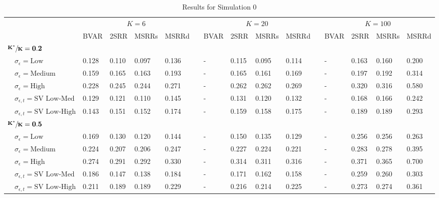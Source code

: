 \begin{table}[!tbp]
\caption{Results for Simulation 0\label{s1_table}} 
\begin{center}
\begin{tabular}{lllllcllllcllll}
\hline\hline
\multicolumn{1}{l}{\bfseries }&\multicolumn{4}{c}{\bfseries $K=6$}&\multicolumn{1}{c}{\bfseries }&\multicolumn{4}{c}{\bfseries $K=20$}&\multicolumn{1}{c}{\bfseries }&\multicolumn{4}{c}{\bfseries $K=100$}\tabularnewline
\cline{2-5} \cline{7-10} \cline{12-15}
\multicolumn{1}{l}{}&\multicolumn{1}{c}{BVAR}&\multicolumn{1}{c}{2SRR}&\multicolumn{1}{c}{MSRRs}&\multicolumn{1}{c}{MSRRd}&\multicolumn{1}{c}{}&\multicolumn{1}{c}{BVAR}&\multicolumn{1}{c}{2SRR}&\multicolumn{1}{c}{MSRRs}&\multicolumn{1}{c}{MSRRd}&\multicolumn{1}{c}{}&\multicolumn{1}{c}{BVAR}&\multicolumn{1}{c}{2SRR}&\multicolumn{1}{c}{MSRRs}&\multicolumn{1}{c}{MSRRd}\tabularnewline
\hline
{\bfseries $\mathbf{\sfrac{K^*}{K}=0.2}$}&&&&&&&&&&&&&&\tabularnewline
~~$\sigma_{\epsilon} =\text{Low}$& 0.128& 0.110& 0.097& 0.136&&-& 0.115& 0.095& 0.114&&-& 0.163& 0.160& 0.200\tabularnewline
~~$\sigma_{\epsilon} =\text{Medium}$& 0.159& 0.165& 0.163& 0.193&&-& 0.165& 0.161& 0.169&&-& 0.197& 0.192& 0.314\tabularnewline
~~$\sigma_{\epsilon} =\text{High}$& 0.228& 0.245& 0.244& 0.271&&-& 0.262& 0.262& 0.269&&-& 0.320& 0.316& 0.580\tabularnewline
~~$\sigma_{\epsilon,t} = \text{SV Low-Med}$& 0.129& 0.121& 0.110& 0.145&&-& 0.131& 0.120& 0.132&&-& 0.168& 0.166& 0.242\tabularnewline
~~$\sigma_{\epsilon,t}  = \text{SV Low-High}$& 0.143& 0.151& 0.152& 0.174&&-& 0.159& 0.158& 0.175&&-& 0.189& 0.189& 0.293\tabularnewline
\hline
{\bfseries $\mathbf{\sfrac{K^*}{K}=0.5}$}&&&&&&&&&&&&&&\tabularnewline
~~$\sigma_{\epsilon} =\text{Low}$& 0.169& 0.130& 0.120& 0.144&&-& 0.150& 0.135& 0.129&&-& 0.256& 0.256& 0.263\tabularnewline
~~$\sigma_{\epsilon} =\text{Medium}$& 0.224& 0.207& 0.206& 0.247&&-& 0.227& 0.224& 0.221&&-& 0.283& 0.278& 0.395\tabularnewline
~~$\sigma_{\epsilon} =\text{High}$& 0.274& 0.291& 0.292& 0.330&&-& 0.314& 0.311& 0.316&&-& 0.371& 0.365& 0.700\tabularnewline
~~$\sigma_{\epsilon,t} = \text{SV Low-Med}$& 0.186& 0.147& 0.138& 0.184&&-& 0.171& 0.162& 0.158&&-& 0.259& 0.260& 0.303\tabularnewline
~~$\sigma_{\epsilon,t}  = \text{SV Low-High}$& 0.211& 0.189& 0.189& 0.229&&-& 0.216& 0.214& 0.225&&-& 0.273& 0.274& 0.361\tabularnewline

\end{tabular}
\end{center}
\end{table}
